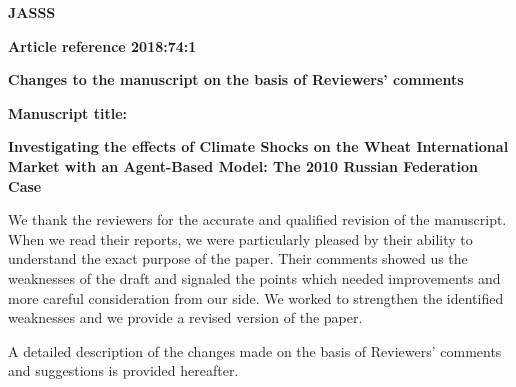 \documentclass[a4paper,12pt]{article}
\begin{document}
	
	\begin{center}
		\textbf{JASSS}

	\vspace{4mm}
\textbf{Article reference 2018:74:1}

	\vspace{4mm}
	{\Large\textbf{Changes to the manuscript on the basis of Reviewers' comments}}

\vspace{4mm}
\textbf{Manuscript title:}

\textbf{Investigating the effects of Climate Shocks on the Wheat International Market with an Agent-Based Model: The 2010 Russian Federation Case}
	\end{center}
\vspace{10mm}


We thank the reviewers for the accurate and qualified revision of the
manuscript. When we read their reports, we were particularly pleased by their ability to
understand the exact purpose of the paper. Their comments showed us the weaknesses of the draft and signaled the points which needed improvements and more careful consideration from our side. 
We worked to strengthen the identified weaknesses and we provide a revised version of the paper.

\iffalse
First of all, their comments convinced us to change the title of the manuscript from \textit{"Investigating the effects of Climate Shocks on the Wheat International Market with an Agent-Based Model: The 2010 Russian Federation Case"} to 
\textit{"A computational model of the Wheat Global Market: the 2010 Russian Federation Case"}.
\fi

\iffalse
First of all, we would like to thank the reviewer for the accurate and qualified revision of the
manuscript. When we read the report, we were particularly impressed by the reviewer's ability to
understand the exact purpose of the model reported in the manuscript.
Her/his comments let us see the weaknesses that escaped our eyes. 
We worked to strengthen the identified weaknesses and we provide a revised version of the paper that we hope the reviewer will find significantly improved.
\fi


A detailed description of the changes made on the basis of  Reviewers' comments and suggestions is provided hereafter. 


\end{document}
